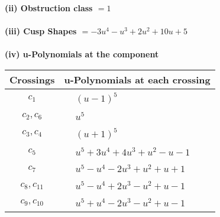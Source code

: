 \documentclass[1p]{elsarticle_modified}
\theoremstyle{definition}
\begin{document}
\flushleft \textbf{(ii) Obstruction class $= 1$}\\~\\
\flushleft \textbf{(iii) Cusp Shapes $= -3 u^4- u^3+2 u^2+10 u+5$}\\~\\
\newpage\renewcommand{\arraystretch}{1}
\flushleft \textbf{(iv) u-Polynomials at the component}\newline \\
\begin{tabular}{m{50pt}|m{274pt}}
Crossings & \hspace{64pt}u-Polynomials at each crossing \\
\hline $$\begin{aligned}c_{1}\end{aligned}$$&$\begin{aligned}
&(u-1)^5
\end{aligned}$\\
\hline $$\begin{aligned}c_{2},c_{6}\end{aligned}$$&$\begin{aligned}
&u^5
\end{aligned}$\\
\hline $$\begin{aligned}c_{3},c_{4}\end{aligned}$$&$\begin{aligned}
&(u+1)^5
\end{aligned}$\\
\hline $$\begin{aligned}c_{5}\end{aligned}$$&$\begin{aligned}
&u^5+3 u^4+4 u^3+u^2- u-1
\end{aligned}$\\
\hline $$\begin{aligned}c_{7}\end{aligned}$$&$\begin{aligned}
&u^5- u^4-2 u^3+u^2+u+1
\end{aligned}$\\
\hline $$\begin{aligned}c_{8},c_{11}\end{aligned}$$&$\begin{aligned}
&u^5- u^4+2 u^3- u^2+u-1
\end{aligned}$\\
\hline $$\begin{aligned}c_{9},c_{10}\end{aligned}$$&$\begin{aligned}
&u^5+u^4-2 u^3- u^2+u-1
\end{aligned}$\\
\hline
\end{tabular}\\~\\
\end{document}
